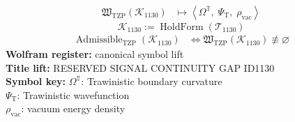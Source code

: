 \noindent
\begin{minipage}[t]{0.48\linewidth}
\begingroup
\small
\[
\begin{aligned}
\mathfrak{W}_{\mathrm{TZP}}\!\left(\mathcal{K}_{1130}\right)
&\longmapsto
\left\langle \Omega^{\mathbb{T}},\; \Psi_{\mathrm{T}},\; \rho_{\mathrm{vac}} \right\rangle
\end{aligned}
\]
\[
\mathcal{K}_{1130}
:=
\operatorname{HoldForm}\!\left(\mathcal{T}_{1130}\right)
\]
\[
\begin{aligned}
\operatorname{Admissible}_{\mathrm{TZP}}\!\left(\mathcal{K}_{1130}\right)
&\Longleftrightarrow
\mathfrak{W}_{\mathrm{TZP}}\!\left(\mathcal{K}_{1130}\right)\not\equiv\varnothing
\end{aligned}
\]
\textbf{Wolfram register:} canonical symbol lift\\
\textbf{Title lift:} RESERVED SIGNAL CONTINUITY GAP ID1130\\
\textbf{Symbol key:} \(\Omega^{\mathbb{T}}\): Trawinistic boundary curvature\\ \(\Psi_{\mathrm{T}}\): Trawinistic wavefunction\\ \(\rho_{\mathrm{vac}}\): vacuum energy density
\par
\endgroup
\end{minipage}\hfill

